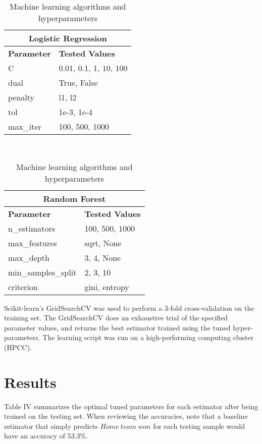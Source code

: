\documentclass[letterpaper, 10 pt, conference]{ieeeconf}
\begin{document}
\begin{table}[h]
\caption{Machine learning algorithms and hyperparameters}
\centering
\begin{tabular}{@{}ll@{}}
\multicolumn{2}{c}{\textbf{Logistic Regression}} \\ \toprule
\textbf{Parameter}     & \textbf{Tested Values}     \\ \midrule
C & 0.01, 0.1, 1, 10, 100\\
dual & True, False\\
penalty & l1, l2\\
tol & 1e-3, 1e-4\\
max\_iter & 100, 500, 1000\\\bottomrule
\end{tabular}\\\medskip
\begin{tabular}{@{}ll@{}}
\multicolumn{2}{c}{\textbf{Random Forest}}                                       \\ \toprule
\textbf{Parameter} & \textbf{Tested Values} \\\midrule
n\_estimators & 100, 500, 1000\\
max\_features & sqrt, None\\
max\_depth & 3, 4, None\\
min\_samples\_split & 2, 3, 10\\
criterion & gini, entropy\\\bottomrule
\end{tabular}
\end{table}

Scikit-learn's GridSearchCV was used to perform a 3-fold cross-validation on the training set. The GridSearchCV does an exhaustive trial of the specified parameter values, and returns the best estimator trained using the tuned hyper-parameters. The learning script was run on a high-performing computing cluster (HPCC).

\section{Results}

Table IV summarizes the optimal tuned parameters for each estimator after being trained on the testing set. When reviewing the accuracies, note that a baseline estimator that simply predicts $Home\ team\ won$ for each testing sample would have an accuracy of 53.3\%.
\end{document}
